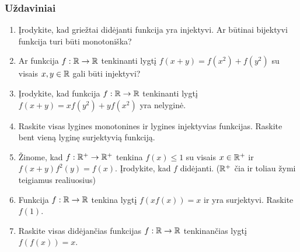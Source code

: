\subsubsection{Uždaviniai}

\begin{enumerate}
  \item Įrodykite, kad griežtai didėjanti funkcija yra injektyvi. Ar
    būtinai bijektyvi funkcija turi būti monotoniška?
  \item Ar funkcija $f:\mathbb R \to \mathbb R$ tenkinanti lygtį $f(x+y) = f(x^2) +
    f(y^2)$ su visais $x,y \in \mathbb R$ gali būti injektyvi?
  \item Įrodykite, kad funkcija $f:\mathbb R\to\mathbb R$ tenkinanti lygtį $f(x+y) =
    xf(y^2) + yf(x^2)$ yra nelyginė.
  \item Raskite visas lygines monotonines ir lygines injektyvias funkcijas.
    Raskite bent vieną lyginę surjektyvią funkciją.
  \item Žinome, kad $f:\mathbb R^+ \to \mathbb R^+$ tenkina $f(x)\leq 1$ su visais $x\in
    \mathbb R^+$ ir $f(x+y)f^2(y)=f(x)$. Įrodykite, kad $f$ didėjanti.  ($\mathbb R^+$
    čia ir toliau žymi teigiamus realiuosius)
  \item Funkcija $f:\mathbb R \to \mathbb R$ tenkina lygtį $f(xf(x)) = x$ ir yra
    surjektyvi. Raskite $f(1)$.
  \item Raskite visas didėjančias funkcijas $f:\mathbb R\to\mathbb R$ tenkinančias lygtį
    $f(f(x))=x$.

\end{enumerate}
